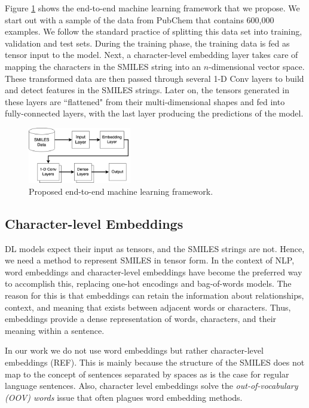     
Figure \ref{fig:ml-framework} shows the end-to-end machine learning framework that we propose. We start out with a sample of the data from PubChem that contains 600,000 examples. We follow the standard practice of splitting this data set into training, validation and test sets. During the training phase, the training data is fed as tensor input to the model. Next, a character-level embedding layer takes care of mapping the characters in the SMILES string into an $n$-dimensional vector space. These transformed data are then passed through several 1-D Conv layers to build and detect features in the SMILES strings. Later on, the tensors generated in these layers are ``flattened" from their multi-dimensional shapes and fed into fully-connected layers, with the last layer producing the predictions of the model.
    \begin{figure}[htbp]
        \centering
        \includegraphics[width=0.4\textwidth]{figures/1DConvArch.png}
        \caption{Proposed end-to-end machine learning framework.}
        \label{fig:ml-framework}
    \end{figure}
\subsection{Character-level Embeddings \label{embeddings}}
DL models expect their input as tensors, and the SMILES strings are not. Hence, we need a method to represent SMILES in tensor form. In the context of NLP, word embeddings and character-level embeddings have become the preferred way to accomplish this, replacing one-hot encodings and bag-of-words models. The reason for this  is that embeddings can retain the information about relationships, context, and meaning that exists between adjacent words or characters. Thus, embeddings provide a dense representation of words, characters, and their
meaning within a sentence. 

In our work we do not use word embeddings but rather character-level embeddings (REF). This is mainly because the structure of the SMILES does not map to the concept of sentences separated by spaces as is the case for regular language sentences. Also, character level embeddings solve the {\em out-of-vocabulary (OOV) words} issue that often plagues word embedding methods.

